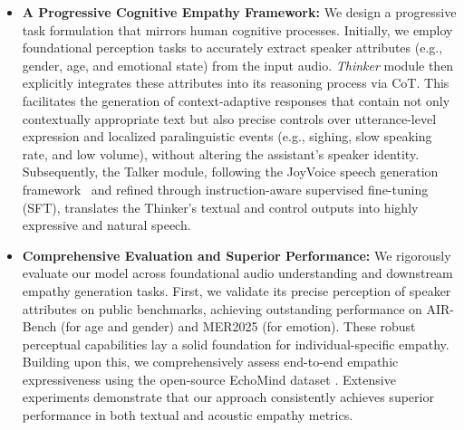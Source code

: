 \begin{itemize}
    \item \textbf{A Progressive Cognitive Empathy Framework:} We design a progressive task formulation that mirrors human cognitive processes. Initially, we employ foundational perception tasks to accurately extract speaker attributes (e.g., gender, age, and emotional state) from the input audio. \textit{Thinker} module then explicitly integrates these attributes into its reasoning process via CoT. This facilitates the generation of context-adaptive responses that contain not
only contextually appropriate text but also precise controls over
utterance-level expression and localized paralinguistic events (e.g., sighing,
slow speaking rate, and low volume), without altering the assistant's speaker
identity. Subsequently, the Talker module, following the JoyVoice speech generation
framework~\cite{joyvoice} and refined through instruction-aware supervised
fine-tuning (SFT), translates the Thinker's textual and control outputs into
highly expressive and natural speech.
    
    \item \textbf{Comprehensive Evaluation and Superior Performance:} We rigorously evaluate our model across foundational audio understanding and downstream empathy generation tasks. First, we validate its precise perception of speaker attributes on public benchmarks, achieving outstanding performance on AIR-Bench \cite{DBLP:conf/acl/YangXLC0ZLLZZZ24} (for age and gender) and MER2025 \cite{DBLP:conf/mm/00040X0L000CZ0P25} (for emotion). These robust perceptual capabilities lay a solid foundation for individual-specific empathy. Building upon this, we comprehensively assess end-to-end empathic expressiveness using the open-source EchoMind dataset \cite{DBLP:journals/corr/abs-2510-22758}. Extensive experiments demonstrate that our approach consistently achieves superior performance in both textual and acoustic empathy metrics.
\end{itemize}


